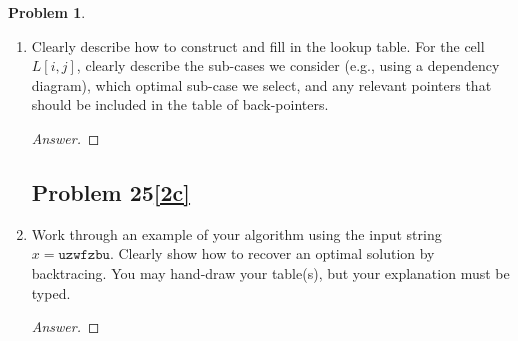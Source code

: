 \documentclass[11pt]{article}
\theoremstyle{definition}
\theoremstyle{definition}
\newtheorem{required}{Problem}
\theoremstyle{definition}
\begin{document}
\begin{required}
\begin{enumerate}[label=(\alph*)]
\begin{proof}[Answer]
For this problem we can see that the subproblem will be to denote the length of the longest reflective subsequence of $x[i, \ldots, j]$.
From this I will write down a recurrence for $L[i, j]$, such that: \\
\begin{align*}
L[i, j] = \begin{cases}
i = 0 &: if (i+j) \neq a_i \lor b_j \\
j = 0 &: if (i+j) \neq a_i \lor b_j  \\
L[i-1, j] &: if (i+j) = a_i \\
L[i, j-1] &: if (i+j) = b_j \\
L[i-1, j] + L[i, j-1] 
\end{cases}
\end{align*}
\end{proof}



\newpage
\subsection{Problem 25\ref{2b}}
\item \label{2b} Clearly describe how to construct and fill in the lookup table. For the cell $L[i, j]$, clearly describe the sub-cases we consider (e.g., using a dependency diagram), which optimal sub-case we select, and any relevant pointers that should be included in the table of back-pointers.

\begin{proof}[Answer]
\end{proof}



\newpage
\subsection{Problem 25\ref{2c}}
\item \label{2c} Work through an example of your algorithm using the input string $x = \texttt{uzwfzbu} $. Clearly show how to recover an optimal solution by backtracing. You may hand-draw your table(s), but your explanation must be typed.

\begin{proof}[Answer]
\end{proof}
\end{enumerate}
\end{required}

\end{document}
